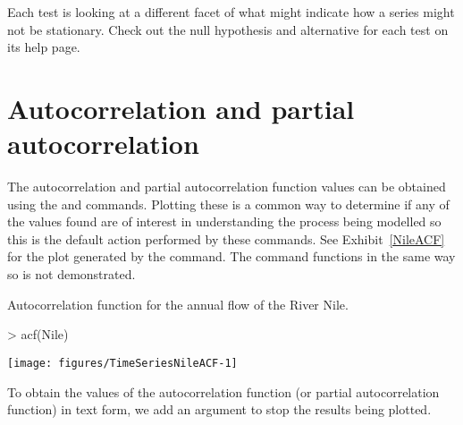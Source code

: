 Each test is looking at a different facet of what might indicate how a series might not be stationary. Check out the null hypothesis and alternative for each test on its help page. 
 
 
 
\section{Autocorrelation and partial autocorrelation} 
 
 
The autocorrelation and partial autocorrelation function values can be obtained using the  and  commands. Plotting these is a common way to determine if any of the values found are of interest in understanding the process being modelled so this is the default action performed by these commands. See Exhibit~\ref{NileACF} for the plot generated by the  command. The  command functions in the same way so is not demonstrated. 
\begin{exhibit} 
\begin{center} 
\caption{Autocorrelation function for the annual flow of the River Nile.} 
\label{NileACF} 

\begin{Schunk}
\begin{Sinput}
> acf(Nile) 
\end{Sinput}

\texttt{[image: figures/TimeSeriesNileACF-1]} \end{Schunk}

\end{center} 
\end{exhibit} 
 
To obtain the values of the autocorrelation function (or partial autocorrelation function) in text form, we add an argument to stop the results being plotted. 

